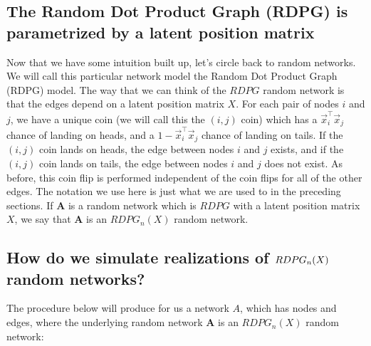 \documentclass[letterpaper,10pt,english]{jupyterBook}
\begin{document}
\subsection{The Random Dot Product Graph (RDPG) is parametrized by a latent position matrix}
\label{\detokenize{representations/ch5/single-network-models_RDPG:the-random-dot-product-graph-rdpg-is-parametrized-by-a-latent-position-matrix}}
\sphinxAtStartPar
Now that we have some intuition built up, let’s circle back to random networks. We will call this particular network model the Random Dot Product Graph (RDPG) model. The way that we can think of the \(RDPG\) random network is that the edges depend on a latent position matrix \(X\). For each pair of nodes \(i\) and \(j\), we have a unique coin (we will call this the \((i,j)\) coin) which has a \(\vec x_i^\top \vec x_j\) chance of landing on heads, and a \(1 - \vec x_i^\top \vec x_j\) chance of landing on tails. If the \((i,j)\) coin lands on heads, the edge between nodes \(i\) and \(j\) exists, and if the \((i,j)\) coin lands on tails, the edge between nodes \(i\) and \(j\) does not exist. As before, this coin flip is performed independent of the coin flips for all of the other edges. The notation we use here is just what we are used to in the preceding sections. If \(\mathbf A\) is a random network which is \(RDPG\) with a latent position matrix \(X\), we say that \(\mathbf A\) is an \(RDPG_n(X)\) random network.


\subsection{How do we simulate realizations of \protect\(RDPG_n(X)\protect\) random networks?}
\label{\detokenize{representations/ch5/single-network-models_RDPG:how-do-we-simulate-realizations-of-rdpg-n-x-random-networks}}
\sphinxAtStartPar
The procedure below will produce for us a network \(A\), which has nodes and edges, where the underlying random network \(\mathbf A\) is an \(RDPG_n(X)\) random network:
\end{document}
